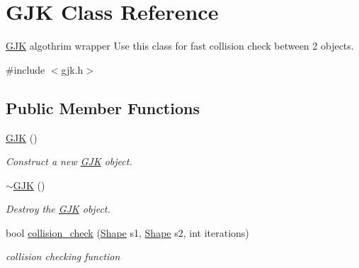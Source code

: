 \hypertarget{classGJK}{}\section{G\+JK Class Reference}
\label{classGJK}


\hyperlink{classGJK}{G\+JK} algothrim wrapper Use this class for fast collision check between 2 objects.  




{\ttfamily \#include $<$gjk.\+h$>$}

\subsection*{Public Member Functions}
\begin{DoxyCompactItemize}
\item 
\mbox{\label{classGJK_ace7ef0c63a492a9ef896c691a0f8eadc}} 
\hyperlink{classGJK_ace7ef0c63a492a9ef896c691a0f8eadc}{G\+JK} ()
\begin{DoxyCompactList}\small\item\em Construct a new \hyperlink{classGJK}{G\+JK} object. \end{DoxyCompactList}\item 
\mbox{\label{classGJK_aa1c552853757d1db1d24d5b43e573e7e}} 
\hyperlink{classGJK_aa1c552853757d1db1d24d5b43e573e7e}{$\sim$\+G\+JK} ()
\begin{DoxyCompactList}\small\item\em Destroy the \hyperlink{classGJK}{G\+JK} object. \end{DoxyCompactList}\item 
bool \hyperlink{classGJK_aa47f0a72a102236c96251951d5b98c78}{collision\+\_\+check} (\hyperlink{structShape}{Shape} s1, \hyperlink{structShape}{Shape} s2, int iterations)
\begin{DoxyCompactList}\small\item\em collision checking function \end{DoxyCompactList}\end{DoxyCompactItemize}
